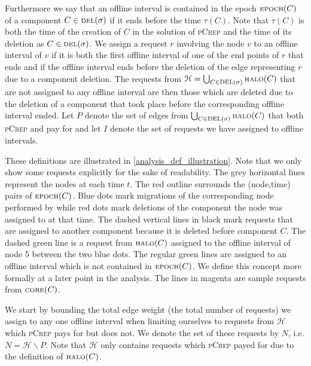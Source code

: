 \documentclass[a4paper,UKenglish,cleveref, autoref, thm-restate,authorcolumns]{lipics-v2019}
\newcommand{\adjDel}{\textsc{pCrep}}
\newcommand{\del}{\text{\scriptsize DEL}}
\newcommand{\opt}{\text{O{\scriptsize PT}}}
\newcommand{\core}{\text{\scriptsize CORE}}
\newcommand{\halo}{\text{\scriptsize HALO}}
\newcommand{\epoch}{\text{\scriptsize EPOCH}}
\begin{document}
Furthermore we say that an offline interval is contained in the epoch $\epoch(C)$ of a component $C\in\del{}(\sigma)$ if it ends before the time $\tau(C)$. 
Note that $\tau(C)$ is both the time of the creation of $C$ in the solution of \adjDel{} and the time of its deletion as $C\in\del{}(\sigma)$.
We assign a request $r$ involving the node $v$ to an offline interval of $v$ if it is both the first offline interval of one of the end points of $r$ 
that ends and if the offline interval ends before the deletion of the edge representing $r$ due to a component deletion.
The requests from $\mathcal{H}=\bigcup_{C\in\del{}(\sigma)}\halo{}(C)$ that are not assigned to any offline interval are then those which are deleted 
due to the deletion of a component that took place before the corresponding offline interval ended.
Let $P$ denote the set of edges from $\bigcup_{C\in\del{}(\sigma)}\halo{}(C)$ that both \adjDel{} and \opt{} pay for and let $I$ denote the set of requests 
we have assigned to offline intervals.

These definitions are illustrated in \cref{analysis_def_illustration}. Note that we only show some requests explicitly for the sake of readability. 
The grey horizontal lines represent the nodes at each time $t$. The red outline surrounds the (node,time) pairs of $\epoch(C)$. 
Blue dots mark migrations of the corresponding node performed by \opt{} while red dots mark deletions of the component the node was assigned to at that time. 
The dashed vertical lines in black mark requests that are assigned to another component because it is deleted before component $C$. 
The dashed green line is a request from $\halo(C)$ assigned to the offline interval of node 5 between the two blue dots. The regular green lines are assigned to 
an offline interval which is not contained in $\epoch(C)$. We define this concept more formally at a later point in the analysis. 
The lines in magenta are sample requests from $\core(C)$.

We start by bounding the total edge weight (the total number of requests) we assign to any one offline interval when limiting ourselves to requests from $\mathcal{H}$ which \adjDel{} pays for but \opt{} does not. We denote the set of these requests by $N$, i.e. $N=\mathcal{H}\backslash P$. Note that $\mathcal{H}$ only contains requests which \adjDel{} payed for due to the definition of $\halo(C)$.
\end{document}
